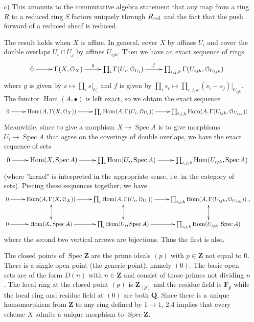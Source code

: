 \documentclass{report}
\renewcommand{\O}{\mathcal{O}}
\newcommand{\Q}{\mathbf{Q}}
\newcommand{\Z}{\mathbf{Z}}
\newcommand{\FF}{\mathbf{F}}
\DeclareMathOperator{\Hom}{Hom}
\DeclareMathOperator{\Spec}{Spec}
\begin{document}
\noindent c)  This amounts to the commutative algebra statement that any map from a ring $R$ to a reduced
ring $S$ factors uniquely through $R_{\rm red}$ and the fact that the push forward of a reduced sheaf is reduced.

\bigskip
{}	The result holds when $X$ is affine.  In general, cover $X$ by affines $U_i$ and cover the double overlaps
$U_i\cap U_j$ by affines $U_{ijk}$.  Then we have an exact sequence of rings
\begin{equation}
\xymatrix{
{0}\ar[r] &{\Gamma(X,\O_X)} \ar[r]^-{g}  & {\prod_i \Gamma(U_i,\O_{U_i})} 
\ar[r]^-{f} & {\prod_{i,j,k} \Gamma(U_{ijk},\O_{U_{ijk}})}
}\nonumber
\end{equation}
where $g$ is given by
$s\mapsto\prod_i s\big|_{U_i}$
and $f$ is given by
$\prod_i s_i\mapsto \prod_{i,j,k} (s_i-s_j)\big|_{U_{ijk}}$.
The functor $\Hom(A,\bullet)$ is left exact, so we obtain the exact sequence
\begin{equation}
\xymatrix{
{0}\ar[r] &{\Hom(A,\Gamma(X,\O_X))} \ar[r]  & {\prod_i \Hom(A,\Gamma(U_i,\O_{U_i}))} 
\ar[r] & {\prod_{i,j,k} \Hom(A,\Gamma(U_{ijk},\O_{U_{ijk}}))}
}\nonumber
\end{equation}
Meanwhile, since to give a morphism $X\rightarrow \Spec A$ is to give morphisms $U_i\rightarrow \Spec A$
that agree on the coverings of double overlaps, we have the exact sequence of sets
\begin{equation}
\xymatrix{
{0}\ar[r] &{\Hom(X,\Spec A)} \ar[r]  & {\prod_i \Hom(U_i,\Spec A)} 
\ar[r] & {\prod_{i,j,k} \Hom(U_{ijk},\Spec A)}
}\nonumber
\end{equation}
(where "kernel" is interpreted in the appropriate sense, i.e. in the category of sets).
Piecing these sequences together, we have
\begin{equation}
\xymatrix{
{0}\ar[r] &{\Hom(A,\Gamma(X,\O_X))} \ar[r] \ar@{<->}[d]  & {\prod_i \Hom(A,\Gamma(U_i,\O_{U_i}))} 
\ar[r] \ar@{<->}[d]& {\prod_{i,j,k} \Hom(A,\Gamma(U_{ijk},\O_{U_{ijk}}))}\ar@{<->}[d]\\
{0}\ar[r] &{\Hom(X,\Spec A)} \ar[r]  & {\prod_i \Hom(U_i,\Spec A)} 
\ar[r] & {\prod_{i,j,k} \Hom(U_{ijk},\Spec A)}
}\nonumber,
\end{equation}
where the second two vertical arrows are bijections.  Thus the first is also.

\bigskip
{}	The closed points of $\Spec \Z$ are the prime ideals $(p)$ with $p\in \Z$ not equal to 0.  There is a single open point 
(the generic point), namely $(0)$.  The basic open sets are of the form $D(n)$ with $n\in\Z$ and consist of
those primes not dividing $n$.  The local ring at the closed point $(p)$ is $\Z_{(p)}$ and
the residue field is $\FF_p$ while the local ring and residue field
at $(0)$ are both $\Q$.	Since there is a unique homomorphism from $\Z$ to any ring defined by  $1\mapsto 1$,
2.4 implies that every scheme $X$ admits a unique morphism to $\Spec \Z$.
\end{document}
